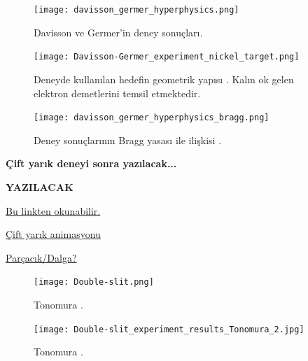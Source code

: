 \documentclass[a4paper,12pt, twoside]{article}
\newcommand{\YAZILACAK}{{\vspace{18pt}\bf\Large \color{red} YAZILACAK}}
\begin{document}
\begin{figure}[hbtp]
\center
\begin{minipage}{0.45\textwidth}
\texttt{[image: davisson\_germer\_hyperphysics.png]}
\caption{Davisson ve Germer'in deney sonuçları\cite{web:hyperphysics_davisson_germer1}.}
\label{fig:davisson_germer3}
\end{minipage}
\hspace{24pt}
\begin{minipage}{0.35\textwidth}
\texttt{[image: Davisson-Germer\_experiment\_nickel\_target.png]}
\caption{\label{fig:davisson_germer4} Deneyde kullanılan hedefin geometrik yapısı \cite{DavissonGermer}. Kalın ok gelen elektron demetlerini temsil etmektedir.}

\vspace{24pt}

\texttt{[image: davisson\_germer\_hyperphysics\_bragg.png]}
\caption{\label{fig:davisson_germer5} Deney sonuçlarının Bragg yasası ile ilişkisi \cite{web:hyperphysics_davisson_germer1}.}
\end{minipage}
\end{figure}


\vspace{24pt}

{\bf Çift yarık deneyi sonra yazılacak...}

\YAZILACAK

\href{https://tr.wikipedia.org/wiki/%C3%87ift_yar%C4%B1k_deneyi}{Bu linkten okunabilir. }


\href{https://youtu.be/qCmtegdqOOA}{Çift yarık animasyonu}

\href{https://youtu.be/O81Cilon10M}{Parçacık/Dalga?}

	

\begin{figure}[hbtp]
\center
\begin{minipage}{0.45\textwidth}
\texttt{[image: Double-slit.png]}
\caption{Tonomura \cite{web:wiki_double_slit_experiment}.}
\label{fig:tonomura}
\end{minipage}
\begin{minipage}{0.45\textwidth}
\texttt{[image: Double-slit\_experiment\_results\_Tonomura\_2.jpg]}
\caption{Tonomura \cite{web:wiki_double_slit_experiment}.}
\label{fig:tonomura1}
\end{minipage}
\end{figure}
\end{document}
